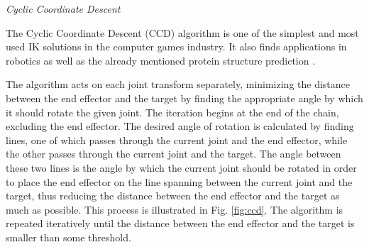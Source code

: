 \noindent\textit{Cyclic Coordinate Descent}

The Cyclic Coordinate Descent (CCD) algorithm \cite{ccd} is one of the simplest and most
used IK solutions in the computer games industry. It also finds
applications in robotics as well as the already mentioned protein structure
prediction \cite{ccd_protein}. 

The algorithm acts on each joint transform separately, minimizing the distance
between the end effector and the target by finding the appropriate angle by
which it should rotate the given joint. The iteration begins at the end of the
chain, excluding the end effector. The desired angle of rotation is calculated by
finding lines, one of which passes through the current joint and the end
effector, while the other passes through the current joint and the target. The
angle between these two lines is the angle by which the current joint should
be rotated in order to place the end effector on the line spanning between the
current joint and the target, thus reducing the distance between the end
effector and the target as much as possible. This process is illustrated in Fig.
\ref{fig:ccd}. The algorithm is repeated iteratively until the distance between the end
effector and the target is smaller than some threshold.

